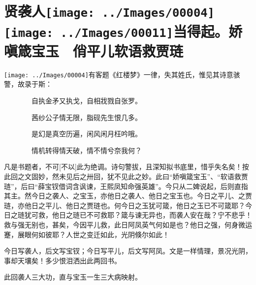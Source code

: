 

\chapter[贤袭人娇嗔箴宝玉　俏平儿软语救贾琏]{\texorpdfstring{贤袭人{\protect\texttt{[image: ../Images/00004]}\protect\texttt{[image: ../Images/00011]}\footnotesize \kaishu 当得起。}娇嗔箴宝玉　俏平儿软语救贾琏}{贤袭人庚辰本侧批当得起。娇嗔箴宝玉　俏平儿软语救贾琏}}
{\texttt{[image: ../Images/00004]}有客题《红楼梦》一律，失其姓氏，惟见其诗意骇警，故录于斯：}

{　　　　自执金矛又执戈，自相戕戮自张罗。}

{　　　　茜纱公子情无限，脂砚先生恨几多。}

{　　　　是幻是真空历遍，闲风闲月枉吟哦。}

{　　　　情机转得情天破，情不情兮奈我何？}

{凡是书题者，不可{[}不以{]}此为绝调。诗句警拔，且深知拟书底里，惜乎失名矣！按此回之文固妙，然未见后之卅回，犹不见此之妙。此曰``娇嗔箴宝玉''、``软语救贾琏''，后曰``薛宝钗借词含讽谏，王熙凤知命强英雄''。今只从二婢说起，后则直指其主。然今日之袭人、之宝玉，亦他日之袭人、他日之宝玉也。今日之平儿、之贾琏，亦他日之平儿、他日之贾琏也。何今日之玉犹可箴，他日之玉已不可箴耶？今日之琏犹可救，他日之琏已不可救耶？箴与谏无异也，而袭人安在哉？宁不悲乎！救与强无别也，甚矣，今因平儿救，此日阿凤英气何如是也？他日之强，何身微运蹇，展眼何如彼耶？人世之变迁如此，光阴倏尔如此！}

{今日写袭人，后文写宝钗；今日写平儿，后文写阿凤。文是一样情理，景况光阴，事却天壤矣！多少恨泪洒出此两回书。}

{此回袭人三大功，直与宝玉一生三大病映射。}

